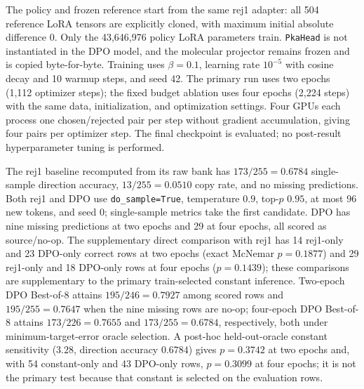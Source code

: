 \documentclass[11pt]{article}
\begin{document}
The policy and frozen reference start from the same rej1 adapter: all 504 reference LoRA tensors are explicitly cloned, with maximum initial absolute difference $0$. Only the 43{,}646{,}976 policy LoRA parameters train. \texttt{PkaHead} is not instantiated in the DPO model, and the molecular projector remains frozen and is copied byte-for-byte. Training uses $\beta=0.1$, learning rate $10^{-5}$ with cosine decay and 10 warmup steps, and seed 42. The primary run uses two epochs (1{,}112 optimizer steps); the fixed budget ablation uses four epochs (2{,}224 steps) with the same data, initialization, and optimization settings. Four GPUs each process one chosen/rejected pair per step without gradient accumulation, giving four pairs per optimizer step. The final checkpoint is evaluated; no post-result hyperparameter tuning is performed.

The rej1 baseline recomputed from its raw bank has $173/255=0.6784$ single-sample direction accuracy, $13/255=0.0510$ copy rate, and no missing predictions. Both rej1 and DPO use \texttt{do\_sample=True}, temperature $0.9$, top-$p$ $0.95$, at most 96 new tokens, and seed 0; single-sample metrics take the first candidate. DPO has nine missing predictions at two epochs and 29 at four epochs, all scored as source/no-op. The supplementary direct comparison with rej1 has 14 rej1-only and 23 DPO-only correct rows at two epochs (exact McNemar $p=0.1877$) and 29 rej1-only and 18 DPO-only rows at four epochs ($p=0.1439$); these comparisons are supplementary to the primary train-selected constant inference. Two-epoch DPO Best-of-8 attains $195/246=0.7927$ among scored rows and $195/255=0.7647$ when the nine missing rows are no-op; four-epoch DPO Best-of-8 attains $173/226=0.7655$ and $173/255=0.6784$, respectively, both under minimum-target-error oracle selection. A post-hoc held-out-oracle constant sensitivity ($3.28$, direction accuracy $0.6784$) gives $p=0.3742$ at two epochs and, with 54 constant-only and 43 DPO-only rows, $p=0.3099$ at four epochs; it is not the primary test because that constant is selected on the evaluation rows.
\end{document}
